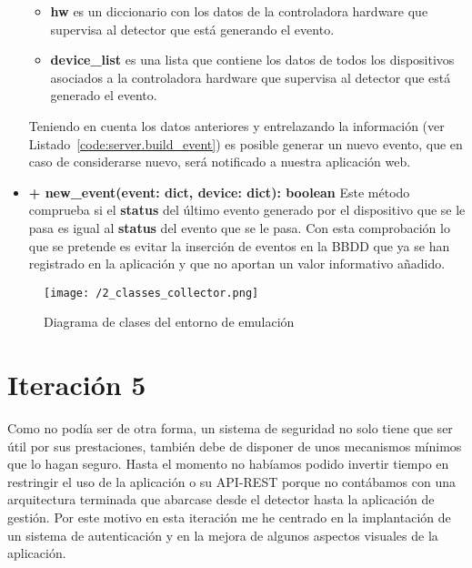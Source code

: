 \begin{itemize}
\begin{itemize}
  \item \textbf{hw} es un diccionario con los datos de la controladora hardware que supervisa al detector que está generando el evento.

  \item \textbf{device\_list} es una lista que contiene los datos de todos los dispositivos asociados a la controladora hardware que supervisa al detector que está generado el evento.
  \end{itemize}

Teniendo en cuenta los datos anteriores y entrelazando la información (ver Listado~\ref{code:server.build_event}) es posible generar un nuevo evento, que en caso de considerarse nuevo, será notificado a nuestra aplicación web.

\hfill


\item \textbf{+ new\_event(event: dict, device: dict): boolean}  Este método comprueba si el \textbf{status} del último evento generado por el dispositivo que se le pasa es igual al \textbf{status} del evento que se le pasa. Con esta comprobación lo que se pretende es evitar la inserción de eventos en la \acs{BBDD} que ya se han registrado en la aplicación y que no aportan un valor informativo añadido. 

\end{itemize}

\begin{figure}[h]
\centering
\texttt{[image: /2\_classes\_collector.png]}
\caption{Diagrama de clases del entorno de emulación}
\label{fig:2_classes_collector}
\end{figure}

\section{Iteración 5}
Como no podía ser de otra forma, un sistema de seguridad no solo tiene que ser útil por sus prestaciones, también debe de disponer de unos mecanismos mínimos que lo hagan seguro. Hasta el momento no habíamos podido invertir tiempo en restringir el uso de la aplicación o su \acs{API}-\acs{REST} porque no contábamos con una arquitectura terminada que abarcase desde el detector hasta la aplicación de gestión. Por este motivo en esta iteración me he centrado en la implantación de un sistema de autenticación  y en la mejora de algunos aspectos visuales de la aplicación.

